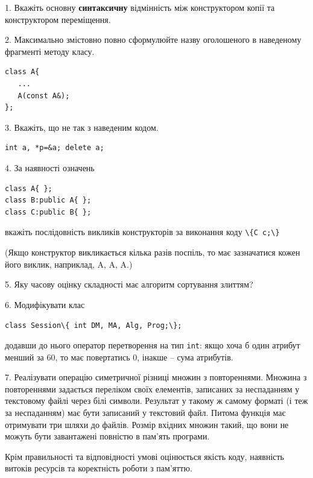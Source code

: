 \documentclass[12pt, ukrainian]{article}
\def\code#1{\Verb!#1!}
\begin{document}
{%
1. Вкажіть основну \textbf{синтаксичну} відмінність між конструктором копії та конструктором переміщення.%
\par
\vspace{2mm}
2. Максимально змістовно повно сформулюйте назву оголошеного в наведеному фрагменті методу класу.
\vspace{-3mm}
\begin{verbatim}class A{
   ...
   A(const A&);
};\end{verbatim}
\vspace{-3mm}
\par
\vspace{2mm}
3. Вкажіть, що не так з наведеним кодом.
\vspace{-3mm}
\begin{verbatim}int a, *p=&a; delete a;\end{verbatim}
\vspace{-3mm}
\par
\vspace{2mm}
4. За наявності означень
\vspace{-3mm}
\begin{verbatim}
class A{ };
class B:public A{ };
class C:public B{ };\end{verbatim}
\vspace{-3mm}
вкажіть послідовність викликів конструкторів за виконання коду \code{\{C c;\}} 

(Якщо конструктор викликається кілька разів поспіль, то має зазначатися кожен його виклик, наприклад, A, A, A.)

\vspace{2mm}
5. Яку часову оцінку складності має алгоритм сортування злиттям?
\par
\vspace{2mm}
6. Модифікувати клас 

\qquad\code{class Session\{ int DM, MA, Alg, Prog;\};} 


додавши до нього оператор перетворення на тип \code{int}: якщо хоча б один атрибут менший за 60, то має повертатись 0, інакше -- сума атрибутів.%
\par
\vspace{2mm}
7. 
Реалізувати операцію симетричної різниці множин з повтореннями. Множина з повтореннями задається переліком своїх елементів, записаних за неспаданням у текстовому файлі через білі символи. Результат у такому ж самому форматі (і теж за неспаданням) має бути записаний у текстовий файл. Питома функція має отримувати три шляхи до файлів. Розмір вхідних множин такий, що вони не можуть бути завантажені повністю в пам’ять програми.

Крім правильності та відповідності умові оцінюється якість коду, наявність витоків ресурсів та коректність роботи з пам'яттю. 

}
\end{document}
